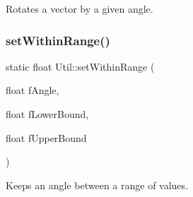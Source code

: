 Rotates a vector by a given angle. 

\mbox{\label{namespace_util_aefa994a894bb4bf287871a0ab756ac00}} 
\subsubsection{\texorpdfstring{set\+Within\+Range()}{setWithinRange()}}
{\footnotesize\ttfamily static float Util\+::set\+Within\+Range (\begin{DoxyParamCaption}\item[{float}]{f\+Angle,  }\item[{float}]{f\+Lower\+Bound,  }\item[{float}]{f\+Upper\+Bound }\end{DoxyParamCaption})\hspace{0.3cm}{\ttfamily [static]}}



Keeps an angle between a range of values. 

